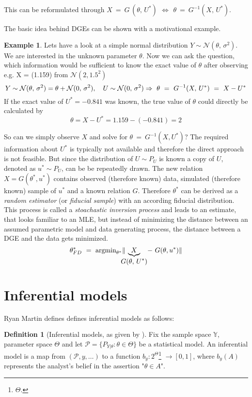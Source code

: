 \documentclass[
]{report}
\theoremstyle{definition}
\theoremstyle{definition}
\newtheorem{definition}{Definition}[section]
\newtheorem{example}{Example}[section]
\begin{document}
This can be reformulated through
\(X \ = \ G \, (\theta, \, U^*) \ \, \Leftrightarrow \ \, \theta \ = \ G^{-1}(X, \, U^*)\).

The basic idea behind DGEs can be shown with a motivational example.

\begin{example}
Lets have a look at a simple normal distribution $Y \sim \mathcal{N}(\theta,\, \sigma^2)$. We are interested in the unknown parameter $\theta$. Now we can ask the question, which information would be sufficient to know the exact value of $\theta$ after observing e.g. X = (1.159) from $\mathcal{N}(2, 1.5^2)$
$$Y \sim \mathcal{N}(\theta,\, \sigma^2) = \theta + \mathcal{N}(0,\, \sigma^2), \quad U \sim \mathcal{N}(0,\, \sigma^2) \newline
\Rightarrow \ \theta \ = \ G^{-1}(X, \, U^*) \ = \ X - U^*$$
If the exact value of $U^* = -0.841$ was known, the true value of $\theta$ could directly be calculated by
$$\theta = X- U^* = 1.159 - (-0.841) = 2$$
\end{example}

So can we simply observe \(X\) and solve for
\(\theta \ = \ G^{-1}(X, U^*)\)? The required information about \(U^*\)
is typically not available and therefore the direct approach is not
feasible. But since the distribution of \(U \sim P_{U}\) is known a copy
of \(U\), denoted as \(u^* \sim P_U\), can be be repeatedly drawn. The
new relation \(X = G(\theta^*, u^*)\) contains observed (therefore
known) data, simulated (therefore known) sample of \(u^*\) and a known
relation \(G\). Therefore \(\theta^*\) can be derived as a
\textit{random estimator} (or \textit{fiducial sample}) with an
according fiducial distribution. This process is called a
\textit{stoachastic inversion process} and leads to an estimate, that
looks familiar to an MLE, but instead of minimizing the distance between
an assumed parametric model and data generating process, the distance
between a DGE and the data gets minimized.
\[\theta^*_{FD} \ = \ \text{argmin}_{\theta^*} \| \hspace{-0.3cm} \underbrace{X}_{\displaystyle{G(\theta, \, U^*)}} \! - \ G(\theta, u^*) \| \]

\section{Inferential models}

Ryan Martin defines defines inferential models as follows:

\begin{definition}[Inferential models, as given by \cite{martin_false_2019}]
Fix the sample space $\mathbb{Y}$, parameter space $\Theta$ and let $\mathscr{P} = \{P_{Y|\theta} : \theta \in \Theta\}$ be a statistical model. An inferential model is a map from $(\mathscr{P}, y, \dots)$ to a function 
$b_y : 2^{\Theta}$\footnote{ $\Theta$.} $\to [0,1]$, where $b_y(A)$ represents the analyst's belief 
in the assertion "$\theta \in A$".
\end{definition}
\end{document}
